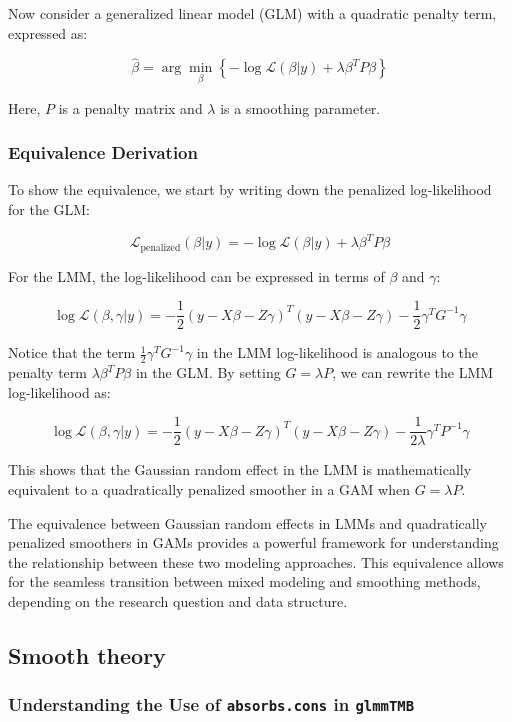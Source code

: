 \documentclass[12pt, twoside,hidelinks]{article}
\theoremstyle{definition}
\numberwithin{equation}{section}
\begin{document}
Now consider a generalized linear model (GLM) with a quadratic penalty term, expressed as:

\[
\hat{\beta} = \arg\min_{\beta} \left\{ -\log \mathcal{L}(\beta | y) + \lambda \beta^T P \beta \right\}
\]

Here, \( P \) is a penalty matrix and \( \lambda \) is a smoothing parameter.

\subsubsection{Equivalence Derivation}

To show the equivalence, we start by writing down the penalized log-likelihood for the GLM:

\[
\mathcal{L}_{\text{penalized}}(\beta | y) = -\log \mathcal{L}(\beta | y) + \lambda \beta^T P \beta
\]

For the LMM, the log-likelihood can be expressed in terms of \( \beta \) and \( \gamma \):

\[
\log \mathcal{L}(\beta, \gamma | y) = -\frac{1}{2} (y - X\beta - Z\gamma)^T (y - X\beta - Z\gamma) - \frac{1}{2} \gamma^T G^{-1} \gamma
\]

Notice that the term \( \frac{1}{2} \gamma^T G^{-1} \gamma \) in the LMM log-likelihood is analogous to the penalty term \( \lambda \beta^T P \beta \) in the GLM. By setting \( G = \lambda P \), we can rewrite the LMM log-likelihood as:

\[
\log \mathcal{L}(\beta, \gamma | y) = -\frac{1}{2} (y - X\beta - Z\gamma)^T (y - X\beta - Z\gamma) - \frac{1}{2\lambda} \gamma^T P^{-1} \gamma
\]

This shows that the Gaussian random effect in the LMM is mathematically equivalent to a quadratically penalized smoother in a GAM when \( G = \lambda P \).
\newline

The equivalence between Gaussian random effects in LMMs and quadratically penalized smoothers in GAMs provides a powerful framework for understanding the relationship between these two modeling approaches. This equivalence allows for the seamless transition between mixed modeling and smoothing methods, depending on the research question and data structure.


\subsection{Smooth theory}

\subsubsection{Understanding the Use of \texttt{absorbs.cons} in \texttt{glmmTMB}}
\end{document}
